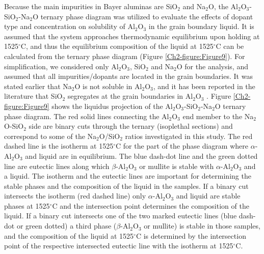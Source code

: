 Because the main impurities in Bayer aluminas are SiO$_{2}$ and Na$_{2}$O, the Al$_{2}$O$_{3}$-SiO$_{2}$-Na$_{2}$O ternary phase diagram \cite{Lambotte2013a} was utilized to evaluate the effects of dopant type and concentration on solubility of Al$_{2}$O$_{3}$ in the grain boundary liquid. It is assumed that the system approaches thermodynamic equilibrium upon holding at 1525$^{\circ}$C, and thus the equilibrium composition of the liquid at 1525$^{\circ}$C can be calculated from the ternary phase diagram (Figure \ref{Ch2-figure:Figure9}). For simplification, we considered only Al$_{2}$O$_{3}$, SiO$_{2}$ and Na$_{2}$O for the analysis, and assumed that all impurities/dopants are located in the grain boundaries. It was stated earlier that Na$_{2}$O is not soluble in Al$_{2}$O$_{3}$, and it has been reported in the literature that SiO$_{2}$ segregates at the grain boundaries in Al$_{2}$O$_{3}$ \cite{Park2000}. Figure \ref{Ch2-figure:Figure9} shows the liquidus projection of the Al$_{2}$O$_{3}$-SiO$_{2}$-Na$_{2}$O ternary phase diagram. The red solid lines connecting the Al$_{2}$O$_{3}$ end member to the Na$_{2}$O-SiO$_{2}$ side are binary cuts through the ternary (isoplethal sections) and correspond to some of the Na$_{2}$O/SiO$_{2}$ ratios investigated in this study. The red dashed line is the isotherm at 1525$^{\circ}$C for the part of the phase diagram where $\alpha$-Al$_{2}$O$_{3}$ and liquid are in equilibrium. The blue dash-dot line and the green dotted line are eutectic lines along which $\beta$-Al$_{2}$O$_{3}$ or mullite is stable with $\alpha$-Al$_{2}$O$_{3}$ and a liquid. The isotherm and the eutectic lines are important for determining the stable phases and the composition of the liquid in the samples. If a binary cut intersects the isotherm (red dashed line) only $\alpha$-Al$_{2}$O$_{3}$ and liquid are stable phases at 1525$^{\circ}$C and the intersection point determines the composition of the liquid. If a binary cut intersects one of the two marked eutectic lines (blue dash-dot or green dotted) a third phase ($\beta$-Al$_{2}$O$_{3}$ or mullite) is stable in those samples, and the composition of the liquid at 1525$^{\circ}$C is determined by the intersection point of the respective intersected eutectic line with the isotherm at 1525$^{\circ}$C.

